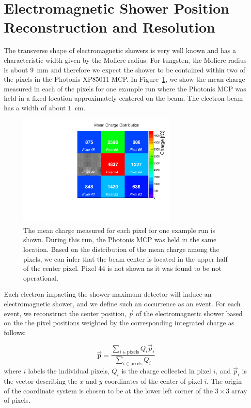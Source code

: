 \documentclass[12pt]{article}
\begin{document}
{\section{ Electromagnetic Shower Position Reconstruction and Resolution}

The transverse shape of electromagnetic showers is very well known and has a
characteristic width given by the Moliere radius. For tungsten, the Moliere
radius is about $9$~mm and therefore we expect the shower to be contained within
two of the pixels in the Photonis XP85011 MCP. In Figure~\ref{fig:exavint}, we
show the mean charge measured in each of the pixels for one example run where
the Photonis MCP was held in a fixed location approximately centered on the
beam. The electron beam has a width of about $1$~cm. 

\begin{figure}[htbp]
	\centering
	\includegraphics[width=8cm]{Images/exavint/exintrun30.pdf}
	\caption{\small The mean charge measured for each pixel for one example run is
shown. During this run, the Photonis MCP was held in the same location. Based on
the distribution of the mean charge among the pixels, we can infer that the beam
center is located in the upper half of the center pixel. Pixel 44 is not shown
as it was found to be not operational. }
	\label{fig:exavint}
\end{figure}

Each electron impacting the shower-maximum detector will induce an
electromagnetic shower, and we define such an occurrence as an event. For each 
event, we reconstruct the center position, $\vec{p}$ of the electromagnetic shower based on the 
the pixel positions weighted by the corresponding integrated charge as follows:

\begin{equation}
\vec{\mathbf{{p}}} = \frac{\sum_{i\in\mathrm{pixels}} Q_{i} \vec{p}_i}
{\sum_{i\in\mathrm{pixels}} Q_{i}}
\end{equation}
where $i$ labels the individual pixels, $Q_{i}$ is the charge collected in pixel 
$i$, and $\vec{p}_{i}$ is the vector describing the $x$ and $y$ coordinates of the center of
pixel $i$. The origin of the coordinate system is chosen to be at the lower left 
corner of the $3\times3$ array of pixels.

}
\end{document}
